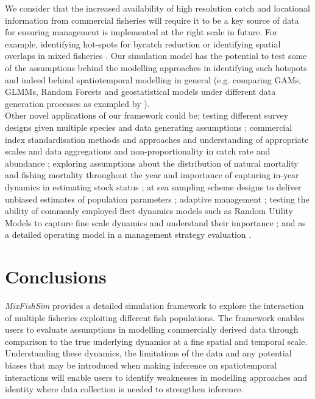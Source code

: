 \documentclass[review]{elsarticle}
\begin{document}
We consider that the increased availability of high resolution catch and
locational information from commercial fisheries will require it to be a key
source of data for ensuring management is implemented at the right scale in
future. For example, identifying hot-spots for bycatch reduction or identifying
spatial overlaps in mixed fisheries \citep{Dolder2018, Gardner2008, Little2014,
	Dedman2015, Ward2015}. Our simulation model has the potential to test
some of the assumptions behind the modelling approaches in identifying such
hotspots and indeed behind spatiotemporal modelling in general (e.g. comparing
GAMs, GLMMs, Random Forests and geostatistical models under different data
generation processes as exampled by \cite{Stock2019}). \\

Other novel applications of our framework could be: testing different survey
designs given multiple species and data generating assumptions \citep{Xu2015};
commercial index standardisation methods and approaches and understanding of
appropriate scales and data aggregations and non-proportionality in catch rate
and abundance \citep{Harley2001, Maunder2004}; exploring assumptions about the
distribution of natural mortality and fishing mortality throughout the year and
importance of capturing in-year dynamics in estimating stock status
\citep{Liu2013}; at sea sampling scheme designs to deliver unbiased estimates
of population parameters \citep{Cotter2007, Kimura2006}; adaptive management
\citep{Walters2007, Dunn2016}; testing the ability of commonly employed fleet
dynamics models such as Random Utility Models to capture fine scale dynamics
and understand their importance \citep{Girardin2016}; and as a detailed
operating model in a management strategy evaluation \citep{Mahevas2004}. \\

\section{Conclusions}

\textit{MixFishSim} provides a detailed simulation framework to explore the
interaction of multiple fisheries exploiting different fish populations. The
framework enables users to evaluate assumptions in modelling commercially
derived data through comparison to the true underlying dynamics at a fine
spatial and temporal scale.  Understanding these dynamics, the limitations of
the data and any potential biases that may be introduced when making inference
on spatiotemporal interactions will enable users to identify weaknesses in
modelling approaches and identity where data collection is needed to strengthen
inference. \\
\end{document}
